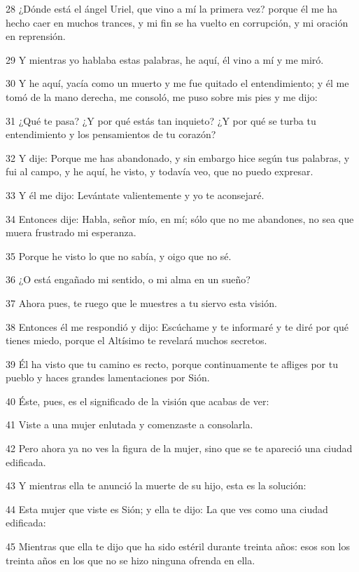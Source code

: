 \par 28 ¿Dónde está el ángel Uriel, que vino a mí la primera vez? porque él me ha hecho caer en muchos trances, y mi fin se ha vuelto en corrupción, y mi oración en reprensión.
\par 29 Y mientras yo hablaba estas palabras, he aquí, él vino a mí y me miró.
\par 30 Y he aquí, yacía como un muerto y me fue quitado el entendimiento; y él me tomó de la mano derecha, me consoló, me puso sobre mis pies y me dijo:
\par 31 ¿Qué te pasa? ¿Y por qué estás tan inquieto? ¿Y por qué se turba tu entendimiento y los pensamientos de tu corazón?
\par 32 Y dije: Porque me has abandonado, y sin embargo hice según tus palabras, y fui al campo, y he aquí, he visto, y todavía veo, que no puedo expresar.
\par 33 Y él me dijo: Levántate valientemente y yo te aconsejaré.
\par 34 Entonces dije: Habla, señor mío, en mí; sólo que no me abandones, no sea que muera frustrado mi esperanza.
\par 35 Porque he visto lo que no sabía, y oigo que no sé.
\par 36 ¿O está engañado mi sentido, o mi alma en un sueño?
\par 37 Ahora pues, te ruego que le muestres a tu siervo esta visión.
\par 38 Entonces él me respondió y dijo: Escúchame y te informaré y te diré por qué tienes miedo, porque el Altísimo te revelará muchos secretos.
\par 39 Él ha visto que tu camino es recto, porque continuamente te afliges por tu pueblo y haces grandes lamentaciones por Sión.
\par 40 Éste, pues, es el significado de la visión que acabas de ver:
\par 41 Viste a una mujer enlutada y comenzaste a consolarla.
\par 42 Pero ahora ya no ves la figura de la mujer, sino que se te apareció una ciudad edificada.
\par 43 Y mientras ella te anunció la muerte de su hijo, esta es la solución:
\par 44 Esta mujer que viste es Sión; y ella te dijo: La que ves como una ciudad edificada:
\par 45 Mientras que ella te dijo que ha sido estéril durante treinta años: esos son los treinta años en los que no se hizo ninguna ofrenda en ella.
